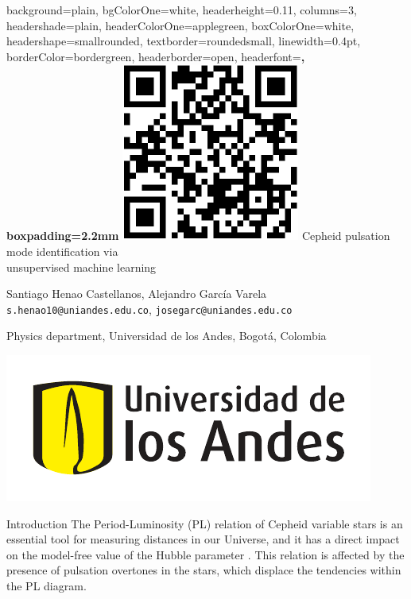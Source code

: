 \documentclass[
    a0paper,
    portrait,
]{baposter}
\begin{document}
\begin{poster}{
  background=plain,
  bgColorOne=white,
  headerheight=0.11\textheight,
  columns=3,
  headershade=plain,
  headerColorOne=applegreen,
  boxColorOne=white,
  headershape=smallrounded,
  textborder=roundedsmall,
  linewidth=0.4pt,
  borderColor=bordergreen,
  headerborder=open,
  headerfont=\large\bf,
  boxpadding=2.2mm
}{
    \includegraphics[width=0.60\headerheight]{fig/provisional_QR.pdf}
}{ \huge
    Cepheid pulsation mode identification via \\ unsupervised machine learning
}{
    \normalsize \vspace{2mm}
    Santiago Henao Castellanos,
    Alejandro García Varela \\ \vspace{1mm}
    \texttt{s.henao10@uniandes.edu.co}, 
    \texttt{josegarc@uniandes.edu.co}
    
    Physics department, Universidad de los Andes, Bogotá, Colombia \\ 
    
}{
    \includegraphics[width=1.5\headerheight]{fig/logo-uniandes.pdf}
}

\begin{posterbox}[name=intro,column=0]{Introduction}
    The Period-Luminosity (PL) relation of Ceph\-eid variable stars is an essential tool for measuring distances in our Universe, and it has a direct impact on the model-free value of the Hubble parameter \citep{Riess2023}. This relation is affected by the presence of pulsation overtones in the stars, which displace the tendencies within the PL diagram.


\end{posterbox}
\end{poster}
\end{document}

